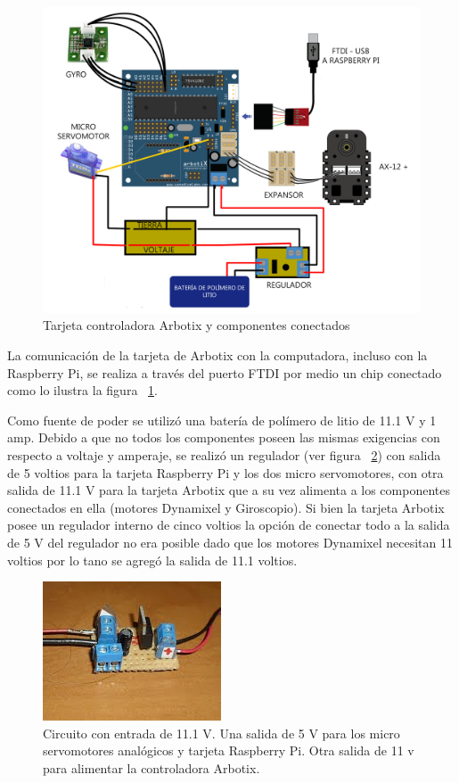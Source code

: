 \begin{figure}[hbtp]
\centering
\includegraphics[scale=0.2]{imagenes/arbotix_servo.png}
\caption{Tarjeta controladora Arbotix y componentes conectados }
\label{fig:arbotixConectados}
\end{figure}

La comunicación de la tarjeta de Arbotix con la computadora, incluso con la Raspberry Pi, se realiza a través del puerto FTDI por medio un chip conectado como lo ilustra la figura ~\ref{fig:arbotixConectados}.

Como fuente de poder se utilizó una batería de polímero de litio de 11.1 V y 1 amp. Debido a que no todos los componentes poseen las mismas exigencias con respecto a voltaje y amperaje, se realizó un regulador (ver figura ~\ref{fig:circuito}) con  salida de 5 voltios para la tarjeta Raspberry Pi y los dos micro servomotores, con otra salida de 11.1 V para la tarjeta Arbotix que a su vez alimenta a los componentes conectados en ella (motores Dynamixel y Giroscopio). Si bien la tarjeta Arbotix posee un regulador interno de cinco voltios la opción de conectar todo a la salida de 5 V del regulador no era posible dado que los motores Dynamixel necesitan 11 voltios por lo tano se agregó la salida de 11.1 voltios.

\begin{figure}[hbtp]
\centering
\includegraphics[scale=0.5]{imagenes/circuito.jpg}
\caption{Circuito con entrada de 11.1 V. Una salida de 5 V para los micro servomotores anal\'ogicos y tarjeta Raspberry Pi. Otra salida de 11 v para alimentar la controladora Arbotix.}
\label{fig:circuito}
\end{figure}

